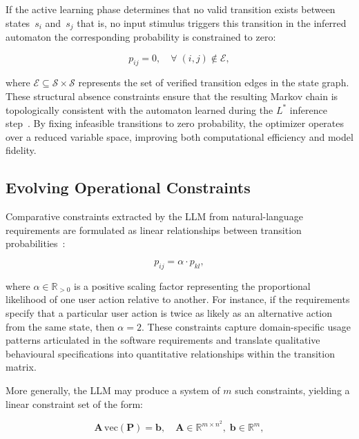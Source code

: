 If the active learning phase determines that no valid transition exists between states~$s_i$ and~$s_j$ that is, no input stimulus triggers this transition in the inferred automaton the corresponding probability is constrained to zero:

\begin{equation}
\label{eq:structural_zero}
p_{ij} = 0, \quad \forall\; (i,j) \notin \mathcal{E},
\end{equation}

\noindent where $\mathcal{E} \subseteq \mathcal{S} \times \mathcal{S}$ represents the set of verified transition edges in the state graph. These structural absence constraints ensure that the resulting Markov chain is topologically consistent with the automaton learned during the $L^{*}$ inference step~\cite{lstar_llm}. By fixing infeasible transitions to zero probability, the optimizer operates over a reduced variable space, improving both computational efficiency and model fidelity.

\subsection{Evolving Operational Constraints}%
\label{subsec:operational_constraints}

Comparative constraints extracted by the LLM from natural-language requirements are formulated as linear relationships between transition probabilities~\cite{boehr_constraints}:

\begin{equation}
\label{eq:proportional}
p_{ij} = \alpha \cdot p_{kl},
\end{equation}

\noindent where $\alpha \in \mathbb{R}_{>0}$ is a positive scaling factor representing the proportional likelihood of one user action relative to another. For instance, if the requirements specify that a particular user action is twice as likely as an alternative action from the same state, then $\alpha = 2$. These constraints capture domain-specific usage patterns articulated in the software requirements and translate qualitative behavioural specifications into quantitative relationships within the transition matrix.

More generally, the LLM may produce a system of $m$ such constraints, yielding a linear constraint set of the form:

\begin{equation}
\label{eq:linear_system}
\mathbf{A}\,\mathrm{vec}(\mathbf{P}) = \mathbf{b}, \quad \mathbf{A} \in \mathbb{R}^{m \times n^2},\; \mathbf{b} \in \mathbb{R}^{m},
\end{equation}

